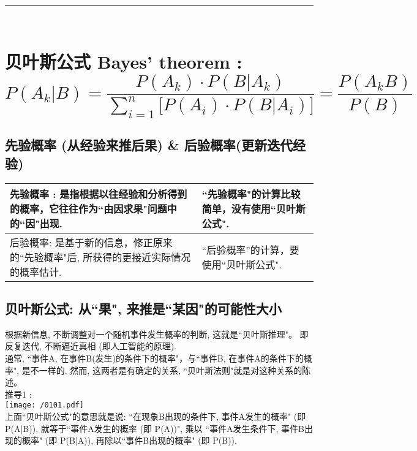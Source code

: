 \documentclass[UTF8]{ctexart}
\begin{document}
~\\
\hrule
~\\



\section{贝叶斯公式 Bayes' theorem : $ \boxed{
	P\left( A_k|B \right) =\dfrac{P\left( A_k \right) \cdot P\left( B|A_k \right)}{\sum_{i=1}^n{\text{[}}P\left( A_i \right) \cdot P\left( B|A_i \right) \text{]}}=\dfrac{P\left( A_kB \right)}{P\left( B \right)}
}	$}

\subsection{先验概率 (从经验来推后果) \& 后验概率(更新迭代经验)}

\begin{tabular}{|p{}|p{}|}
	\hline
先验概率 :	是指根据以往经验和分析得到的概率，它往往作为``由因求果"问题中的``因"出现.  
&   
``先验概率"的计算比较简单，没有使用``贝叶斯公式". \\
	\hline
后验概率: 是基于新的信息，修正原来的``先验概率"后, 所获得的更接近实际情况的概率估计.	
& ``后验概率''的计算，要使用``贝叶斯公式".
	  \\
	\hline
\end{tabular} 




\subsection{贝叶斯公式: 从``果", 来推是``某因"的可能性大小}

根据新信息, 不断调整对一个随机事件发生概率的判断, 这就是``贝叶斯推理"。 即反复迭代, 不断逼近真相 (即人工智能的原理). \\

通常, ``事件A, 在事件B(发生)的条件下的概率"，与``事件B, 在事件A的条件下的概率", 是不一样的. 然而, 这两者是有确定的关系, ``贝叶斯法则"就是对这种关系的陈述。 \\

推导1 : \\
\texttt{[image: /0101.pdf]} \\

上面``贝叶斯公式"的意思就是说: ``在现象B出现的条件下, 事件A发生的概率" (即 P(A|B)), 就等于``事件A发生的概率 (即 P(A))", 乘以 ``事件A发生条件下, 事件B出现的概率" (即 P(B|A)), 再除以``事件B出现的概率" (即 P(B)). \\
\end{document}
